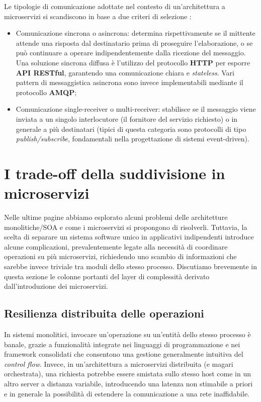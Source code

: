 Le tipologie di comunicazione adottate nel contesto di un'architettura a microservizi si scandiscono in base a due criteri di selezione \cite[19]{Thesis_microservices}:
\begin{itemize}
  \item Comunicazione sincrona o asincrona: determina rispettivamente se il mittente attende una risposta dal destinatario prima di proseguire l'elaborazione, o se può continuare a operare indipendentemente dalla ricezione del messaggio. Una soluzione sincrona diffusa è l'utilizzo del protocollo \textbf{HTTP} per esporre \textbf{API RESTful}, garantendo una comunicazione chiara e \emph{stateless}. Vari pattern di messaggistica asincrona sono invece implementabili mediante il protocollo \textbf{AMQP};
  \item Comunicazione single-receiver o multi-receiver: stabilisce se il messaggio viene inviata a un singolo interlocutore (il fornitore del servizio richiesto) o in generale a più destinatari (tipici di questa categoria sono protocolli di tipo \emph{publish/subscribe}, fondamentali nella progettazione di sistemi event-driven).
\end{itemize}

\section{I trade-off della suddivisione in microservizi}
Nelle ultime pagine abbiamo esplorato alcuni problemi delle architetture monolitiche/SOA e come i microservizi si propongono di risolverli. Tuttavia, la scelta di separare un sistema software unico in applicativi indipendenti introduce alcune complicazioni, prevalentemente legate alla necessità di coordinare operazioni su più microservizi, richiedendo uno scambio di informazioni che sarebbe invece triviale tra moduli dello stesso processo.
Discutiamo brevemente in questa sezione le colonne portanti del layer di complessità derivato dall'introduzione dei microservizi.

\subsection{Resilienza distribuita delle operazioni}
In sistemi monolitici, invocare un'operazione su un'entità dello stesso processo è banale, grazie a funzionalità integrate nei linguaggi di programmazione e nei framework consolidati che consentono una gestione generalmente intuitiva del \emph{control flow}.
Invece, in un'architettura a microservizi distribuita (e magari orchestrata), una richiesta potrebbe essere smistata sullo stesso host come in un altro server a distanza variabile, introducendo una latenza non stimabile a priori e in generale la possibilità di estendere la comunicazione a una rete inaffidabile.

